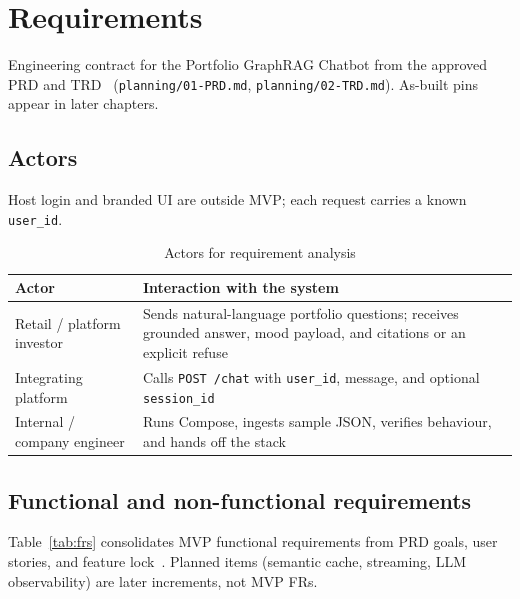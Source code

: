 \chapter{Requirements}
\label{ch:requirements}
\label{ch:prd}
\label{ch:trd}

Engineering contract for the Portfolio GraphRAG Chatbot from the approved PRD and TRD~\cite{prd,trd} (\texttt{planning/01-PRD.md}, \texttt{planning/02-TRD.md}). As-built pins appear in later chapters.

\section{Actors}

Host login and branded UI are outside MVP; each request carries a known \texttt{user\_id}.

\begin{table}[!htbp]
\centering
\small
\caption{Actors for requirement analysis}
\label{tab:actors}
\begin{tabularx}{\textwidth}{@{}
  >{\raggedright\arraybackslash}p{}
  >{\raggedright\arraybackslash}X
  @{}}
\toprule
\textbf{Actor} & \textbf{Interaction with the system} \\
\midrule
Retail / platform investor &
Sends natural-language portfolio questions; receives grounded answer, mood payload, and citations or an explicit refuse \\
\addlinespace
Integrating platform &
Calls \texttt{POST /chat} with \texttt{user\_id}, message, and optional \texttt{session\_id} \\
\addlinespace
Internal / company engineer &
Runs Compose, ingests sample JSON, verifies behaviour, and hands off the stack \\
\bottomrule
\end{tabularx}
\end{table}

\section{Functional and non-functional requirements}

Table~\ref{tab:frs} consolidates MVP functional requirements from PRD goals, user stories, and feature lock~\cite{prd}. Planned items (semantic cache, streaming, LLM observability) are later increments, not MVP FRs.

